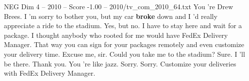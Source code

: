 \begin{textsample}{NEG Dim 4 – 2010 – Score -1.00 – 2010/tv\_com\_2010\_64.txt}  \label{ex:f4_neg_047}
You 're Drew Brees.
I 'm sorry to bother you, but my car \textbf{broke} down and I 'd really appreciate a ride to the stadium.
Yes, but no.
I have to stay here and wait for a package.
I thought anybody who rooted for me would have FedEx Delivery Manager.
That way you can sign for your packages remotely and even customize your delivery time.
Excuse me, sir.
Could you take me to the stadium?
Sure.
I 'll be there.
Thank you.
You 're like jazz.
Sorry.
Sorry.
Customize your deliveries with FedEx Delivery Manager.

\end{textsample}
